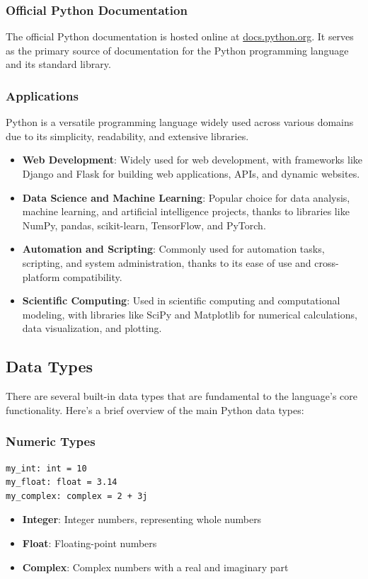 \subsubsection{Official Python Documentation}
The official Python documentation is hosted online at \href{https://docs.python.org/3/}{docs.python.org}. It serves as the primary source of documentation for the Python programming language and its standard library.

\subsubsection{Applications}
Python is a versatile programming language widely used across various domains due to its simplicity, readability, and extensive libraries.
\begin{itemize}
    \item \textbf{Web Development}: Widely used for web development, with frameworks like Django and Flask for building web applications, APIs, and dynamic websites.
    \item \textbf{Data Science and Machine Learning}: Popular choice for data analysis, machine learning, and artificial intelligence projects, thanks to libraries like NumPy, pandas, scikit-learn, TensorFlow, and PyTorch.
    \item \textbf{Automation and Scripting}: Commonly used for automation tasks, scripting, and system administration, thanks to its ease of use and cross-platform compatibility.
    \item \textbf{Scientific Computing}: Used in scientific computing and computational modeling, with libraries like SciPy and Matplotlib for numerical calculations, data visualization, and plotting.
\end{itemize}

\newpage
\subsection{Data Types}

There are several built-in data types that are fundamental to the language's core functionality. Here's a brief overview of the main Python data types:

\subsubsection{Numeric Types}
\begin{codebox}
\begin{verbatim}
my_int: int = 10
my_float: float = 3.14
my_complex: complex = 2 + 3j
\end{verbatim}
\end{codebox}
\begin{itemize}
\item \textbf{Integer}: Integer numbers, representing whole numbers
\item \textbf{Float}: Floating-point numbers
\item \textbf{Complex}: Complex numbers with a real and imaginary part
\end{itemize}

